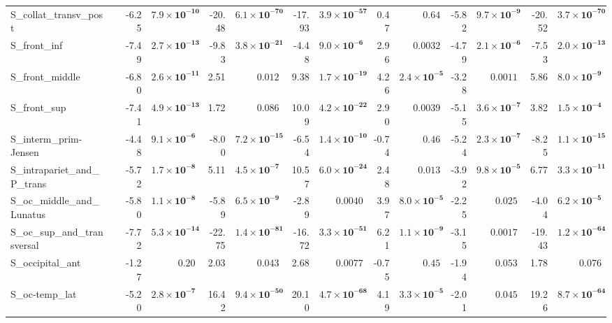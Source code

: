 {\begin{longtable}{llrrrrrrrrrrrr}
S\_collat\_transv\_post &  & -6.25 & $\mathbf{7.9{\times}10^{-10}}$ & -20.48 & $\mathbf{6.1{\times}10^{-70}}$ & -17.93 & $\mathbf{3.9{\times}10^{-57}}$ & 0.47 & $0.64$ & -5.82 & $\mathbf{9.7{\times}10^{-9}}$ & -20.52 & $\mathbf{3.7{\times}10^{-70}}$ \\
S\_front\_inf &  & -7.49 & $\mathbf{2.7{\times}10^{-13}}$ & -9.83 & $\mathbf{3.8{\times}10^{-21}}$ & -4.48 & $\mathbf{9.0{\times}10^{-6}}$ & 2.96 & $0.0032$ & -4.79 & $\mathbf{2.1{\times}10^{-6}}$ & -7.53 & $\mathbf{2.0{\times}10^{-13}}$ \\
S\_front\_middle &  & -6.80 & $\mathbf{2.6{\times}10^{-11}}$ & 2.51 & $0.012$ & 9.38 & $\mathbf{1.7{\times}10^{-19}}$ & 4.26 & $\mathbf{2.4{\times}10^{-5}}$ & -3.28 & $0.0011$ & 5.86 & $\mathbf{8.0{\times}10^{-9}}$ \\
S\_front\_sup &  & -7.41 & $\mathbf{4.9{\times}10^{-13}}$ & 1.72 & $0.086$ & 10.09 & $\mathbf{4.2{\times}10^{-22}}$ & 2.90 & $0.0039$ & -5.15 & $\mathbf{3.6{\times}10^{-7}}$ & 3.82 & $\mathbf{1.5{\times}10^{-4}}$ \\
S\_interm\_prim-Jensen &  & -4.48 & $\mathbf{9.1{\times}10^{-6}}$ & -8.00 & $\mathbf{7.2{\times}10^{-15}}$ & -6.54 & $\mathbf{1.4{\times}10^{-10}}$ & -0.74 & $0.46$ & -5.24 & $\mathbf{2.3{\times}10^{-7}}$ & -8.25 & $\mathbf{1.1{\times}10^{-15}}$ \\
S\_intrapariet\_and\_P\_trans &  & -5.72 & $\mathbf{1.7{\times}10^{-8}}$ & 5.11 & $\mathbf{4.5{\times}10^{-7}}$ & 10.57 & $\mathbf{6.0{\times}10^{-24}}$ & 2.48 & $0.013$ & -3.92 & $\mathbf{9.8{\times}10^{-5}}$ & 6.77 & $\mathbf{3.3{\times}10^{-11}}$ \\
S\_oc\_middle\_and\_Lunatus &  & -5.80 & $\mathbf{1.1{\times}10^{-8}}$ & -5.89 & $\mathbf{6.5{\times}10^{-9}}$ & -2.89 & $0.0040$ & 3.97 & $\mathbf{8.0{\times}10^{-5}}$ & -2.25 & $0.025$ & -4.04 & $\mathbf{6.2{\times}10^{-5}}$ \\
S\_oc\_sup\_and\_transversal &  & -7.72 & $\mathbf{5.3{\times}10^{-14}}$ & -22.75 & $\mathbf{1.4{\times}10^{-81}}$ & -16.72 & $\mathbf{3.3{\times}10^{-51}}$ & 6.21 & $\mathbf{1.1{\times}10^{-9}}$ & -3.15 & $0.0017$ & -19.43 & $\mathbf{1.2{\times}10^{-64}}$ \\
S\_occipital\_ant &  & -1.27 & $0.20$ & 2.03 & $0.043$ & 2.68 & $0.0077$ & -0.75 & $0.45$ & -1.94 & $0.053$ & 1.78 & $0.076$ \\
S\_oc-temp\_lat &  & -5.20 & $\mathbf{2.8{\times}10^{-7}}$ & 16.42 & $\mathbf{9.4{\times}10^{-50}}$ & 20.10 & $\mathbf{4.7{\times}10^{-68}}$ & 4.19 & $\mathbf{3.3{\times}10^{-5}}$ & -2.01 & $0.045$ & 19.26 & $\mathbf{8.7{\times}10^{-64}}$ \\

\end{longtable}}
